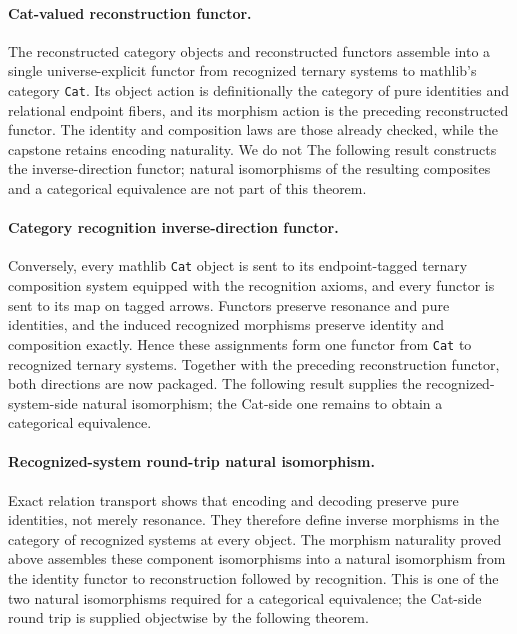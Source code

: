\documentclass[11pt]{article}
\theoremstyle{definition}
\begin{document}
\paragraph{Cat-valued reconstruction functor.}
The reconstructed category objects and reconstructed functors assemble into a
single universe-explicit functor from recognized ternary systems to mathlib's
category \texttt{Cat}.  Its object action is definitionally the category of
pure identities and relational endpoint fibers, and its morphism action is the
preceding reconstructed functor.  The identity and composition laws are those
already checked, while the capstone retains encoding naturality.  We do not
The following result constructs the inverse-direction functor; natural
isomorphisms of the resulting composites and a categorical equivalence are not
part of this theorem.

\paragraph{Category recognition inverse-direction functor.}
Conversely, every mathlib \texttt{Cat} object is sent to its endpoint-tagged
ternary composition system equipped with the recognition axioms, and every
functor is sent to its map on tagged arrows.  Functors preserve resonance and
pure identities, and the induced recognized morphisms preserve identity and
composition exactly.  Hence these assignments form one functor from
\texttt{Cat} to recognized ternary systems.  Together with the preceding
reconstruction functor, both directions are now packaged.  The following
result supplies the recognized-system-side natural isomorphism; the Cat-side
one remains to obtain a categorical equivalence.

\paragraph{Recognized-system round-trip natural isomorphism.}
Exact relation transport shows that encoding and decoding preserve pure
identities, not merely resonance.  They therefore define inverse morphisms in
the category of recognized systems at every object.  The morphism naturality
proved above assembles these component isomorphisms into a natural isomorphism
from the identity functor to reconstruction followed by recognition.  This is
one of the two natural isomorphisms required for a categorical equivalence; the
Cat-side round trip is supplied objectwise by the following theorem.
\end{document}
